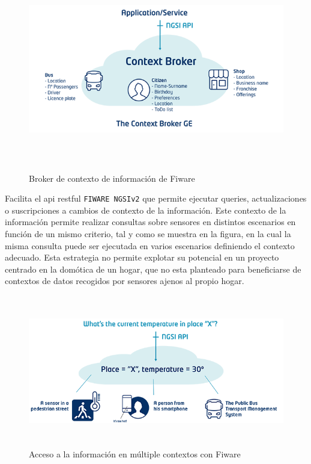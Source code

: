 \vspace{0.5cm}
\begin{figure}[hbt!]
\label{fiwarecontext}
\centering
\includegraphics[height=3.5in]{figures/fiware_context_broker.png}
\caption[Broker de contexto de información de Fiware]{Broker de contexto de información de Fiware}
\end{figure}

Facilita el \gls{api} restful \verb|FIWARE NGSIv2| que permite ejecutar queries, actualizaciones o suscripciones a cambios de contexto de la información. Este contexto de la información permite realizar consultas sobre sensores en distintos escenarios en función de un mismo criterio, tal y como se muestra en la figura, en la cual la misma consulta puede ser ejecutada en varios escenarios definiendo el contexto adecuado. Esta estrategia no permite explotar su potencial en un proyecto centrado en la domótica de un hogar, que no esta planteado para beneficiarse de contextos de datos recogidos por sensores ajenos al propio hogar.

\vspace{0.5cm}
\begin{figure}[hbt!]
\label{fiwarechangecontext}
\centering
\includegraphics[height=2.6in]{figures/fiware_context_change.png}
\caption[Acceso a la información en múltiple contextos con Fiware]{Acceso a la información en múltiple contextos con Fiware}
\end{figure}



